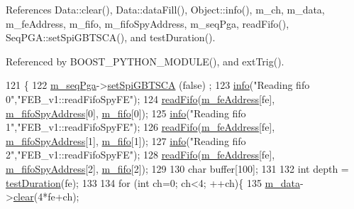 References Data\+::clear(), Data\+::data\+Fill(), Object\+::info(), m\+\_\+ch, m\+\_\+data, m\+\_\+fe\+Address, m\+\_\+fifo, m\+\_\+fifo\+Spy\+Address, m\+\_\+seq\+Pga, read\+Fifo(), Seq\+P\+G\+A\+::set\+Spi\+G\+B\+T\+S\+C\+A(), and test\+Duration().



Referenced by B\+O\+O\+S\+T\+\_\+\+P\+Y\+T\+H\+O\+N\+\_\+\+M\+O\+D\+U\+L\+E(), and ext\+Trig().


\begin{DoxyCode}
121                                              \{
122   \hyperlink{classFEB__v1_a6c7804ac86796f233a8393043adf2e77}{m\_seqPga}->\hyperlink{classSeqPGA_ae5449d6970bffd8de3670a8a1ce6942d}{setSpiGBTSCA} (\textcolor{keyword}{false}) ;
123   \hyperlink{classObject_a644fd329ea4cb85f54fa6846484b84a8}{info}(\textcolor{stringliteral}{"Reading fifo 0"},\textcolor{stringliteral}{"FEB\_v1::readFifoSpyFE"});
124   \hyperlink{classFEB__v1_af945f99a912c5ad076ebdb03dbb6c139}{readFifo}(\hyperlink{classFEB__v1_a4e1945c2d5b434125f375e9d0fc6d99f}{m\_feAddress}[fe], \hyperlink{classFEB__v1_a15b48648ba4534e732376b68bddc5d34}{m\_fifoSpyAddress}[0], 
      \hyperlink{classFEB__v1_ae5b770f2f5ffb97324862c93e3153985}{m\_fifo}[0]);
125   \hyperlink{classObject_a644fd329ea4cb85f54fa6846484b84a8}{info}(\textcolor{stringliteral}{"Reading fifo 1"},\textcolor{stringliteral}{"FEB\_v1::readFifoSpyFE"});
126   \hyperlink{classFEB__v1_af945f99a912c5ad076ebdb03dbb6c139}{readFifo}(\hyperlink{classFEB__v1_a4e1945c2d5b434125f375e9d0fc6d99f}{m\_feAddress}[fe], \hyperlink{classFEB__v1_a15b48648ba4534e732376b68bddc5d34}{m\_fifoSpyAddress}[1], 
      \hyperlink{classFEB__v1_ae5b770f2f5ffb97324862c93e3153985}{m\_fifo}[1]);
127   \hyperlink{classObject_a644fd329ea4cb85f54fa6846484b84a8}{info}(\textcolor{stringliteral}{"Reading fifo 2"},\textcolor{stringliteral}{"FEB\_v1::readFifoSpyFE"});
128   \hyperlink{classFEB__v1_af945f99a912c5ad076ebdb03dbb6c139}{readFifo}(\hyperlink{classFEB__v1_a4e1945c2d5b434125f375e9d0fc6d99f}{m\_feAddress}[fe], \hyperlink{classFEB__v1_a15b48648ba4534e732376b68bddc5d34}{m\_fifoSpyAddress}[2], 
      \hyperlink{classFEB__v1_ae5b770f2f5ffb97324862c93e3153985}{m\_fifo}[2]);
129   
130   \textcolor{keywordtype}{char} buffer[100];
131   
132   \textcolor{keywordtype}{int} depth = \hyperlink{classFEB__v1_a7f1db8ca9490172fce7603da9e703dec}{testDuration}(fe);
133 
134   \textcolor{keywordflow}{for} (\textcolor{keywordtype}{int} ch=0; ch<4; ++ch)\{
135     \hyperlink{classFEB__v1_a1c9dbc3660021dba1f58666d0097abb0}{m\_data}->\hyperlink{classData_acdda95480997a3d6245799810334739d}{clear}(4*fe+ch);

\end{DoxyCode}
